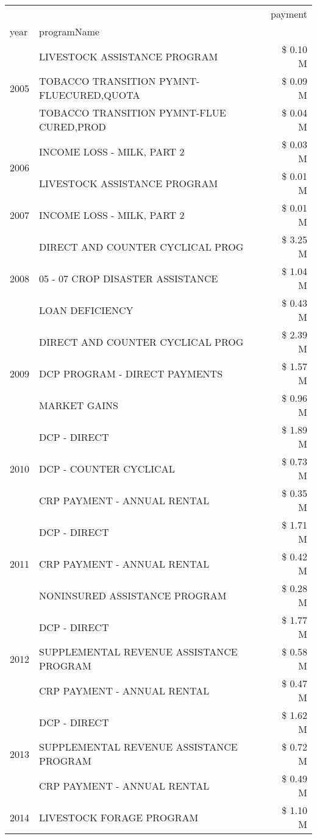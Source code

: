 \begin{tabular}{llr}
\toprule
 &  & payment \\
year & programName &  \\
\midrule
\multirow[t]{3}{*}{2005} & LIVESTOCK ASSISTANCE PROGRAM & \$ 0.10 M \\
 & TOBACCO TRANSITION PYMNT-FLUECURED,QUOTA & \$ 0.09 M \\
 & TOBACCO TRANSITION PYMNT-FLUE CURED,PROD & \$ 0.04 M \\
\cline{1-3}
\multirow[t]{2}{*}{2006} & INCOME LOSS - MILK, PART 2 & \$ 0.03 M \\
 & LIVESTOCK ASSISTANCE PROGRAM & \$ 0.01 M \\
\cline{1-3}
2007 & INCOME LOSS - MILK, PART 2 & \$ 0.01 M \\
\cline{1-3}
\multirow[t]{3}{*}{2008} & DIRECT AND COUNTER CYCLICAL PROG & \$ 3.25 M \\
 & 05 - 07 CROP DISASTER ASSISTANCE & \$ 1.04 M \\
 & LOAN DEFICIENCY & \$ 0.43 M \\
\cline{1-3}
\multirow[t]{3}{*}{2009} & DIRECT AND COUNTER CYCLICAL PROG & \$ 2.39 M \\
 & DCP PROGRAM - DIRECT PAYMENTS & \$ 1.57 M \\
 & MARKET GAINS & \$ 0.96 M \\
\cline{1-3}
\multirow[t]{3}{*}{2010} & DCP - DIRECT & \$ 1.89 M \\
 & DCP - COUNTER CYCLICAL & \$ 0.73 M \\
 & CRP PAYMENT - ANNUAL RENTAL & \$ 0.35 M \\
\cline{1-3}
\multirow[t]{3}{*}{2011} & DCP - DIRECT & \$ 1.71 M \\
 & CRP PAYMENT - ANNUAL RENTAL & \$ 0.42 M \\
 & NONINSURED ASSISTANCE PROGRAM & \$ 0.28 M \\
\cline{1-3}
\multirow[t]{3}{*}{2012} & DCP - DIRECT & \$ 1.77 M \\
 & SUPPLEMENTAL REVENUE ASSISTANCE PROGRAM & \$ 0.58 M \\
 & CRP PAYMENT - ANNUAL RENTAL & \$ 0.47 M \\
\cline{1-3}
\multirow[t]{3}{*}{2013} & DCP - DIRECT & \$ 1.62 M \\
 & SUPPLEMENTAL REVENUE ASSISTANCE PROGRAM & \$ 0.72 M \\
 & CRP PAYMENT - ANNUAL RENTAL & \$ 0.49 M \\
\cline{1-3}
\multirow[t]{3}{*}{2014} & LIVESTOCK FORAGE PROGRAM & \$ 1.10 M \\

\end{tabular}
